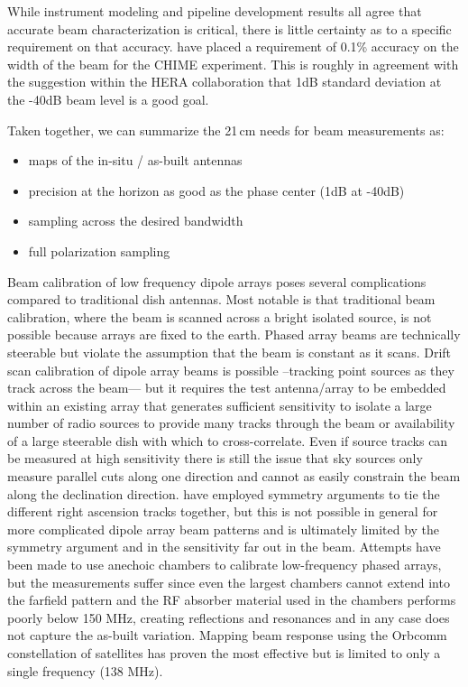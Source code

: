\documentclass[preprint2,numberedappendix,tighten,twocolappendix]{aastex6}
\begin{document}
While instrument modeling and pipeline development results all agree that accurate beam characterization is critical, there is little certainty as to a specific requirement on that accuracy.  \citet{Shaw2015_chimemmodes} have placed a requirement of 0.1\% accuracy on the width of the beam for the CHIME experiment. This is roughly in agreement with the suggestion within the HERA collaboration that 1dB standard deviation at the -40dB beam level is a good goal.

Taken together, we can summarize the 21\,cm needs for beam measurements as:
\begin{itemize}
\item maps of the in-situ / as-built antennas
\item precision at the horizon as good as the phase center (1dB at -40dB)
\item sampling across the desired bandwidth
\item full polarization sampling
\end{itemize} 




Beam calibration of low frequency dipole arrays poses several complications compared to traditional dish antennas. Most notable is that traditional beam calibration, where the beam is scanned across a bright isolated source, is not possible because arrays are fixed to the earth. Phased array beams are technically steerable but violate the assumption that the beam is constant as it scans. Drift scan calibration of dipole array beams is possible --tracking point sources as they track across the beam--- but it requires the test antenna/array to be embedded within an existing array that generates sufficient sensitivity to isolate a large number of radio sources to provide many tracks through the beam or availability of a large steerable dish with which to cross-correlate\citet{Berger:CHIME_beam_map2016-arxiv}. Even if source tracks can be measured at high sensitivity there is still the issue that sky sources only measure parallel cuts along one direction and cannot as easily constrain the beam along the declination direction. \citet{Pober:2013p9942} have employed symmetry arguments to tie the different right ascension tracks together, but this is not possible in general for more complicated dipole array beam patterns and is ultimately limited by the symmetry argument and in the sensitivity far out in the beam.   Attempts have been made to use anechoic chambers to calibrate low-frequency phased arrays, but the measurements suffer since even the largest chambers cannot extend into the farfield pattern and the RF absorber material used in the chambers performs poorly below 150 MHz, creating reflections and resonances and in any case does not capture the as-built variation. Mapping beam response using the Orbcomm constellation of satellites has proven the most effective \citep{2015RaSc...50..614N,2016:NebenHERAdish} but is limited to only a single frequency (138 MHz).  
\end{document}
